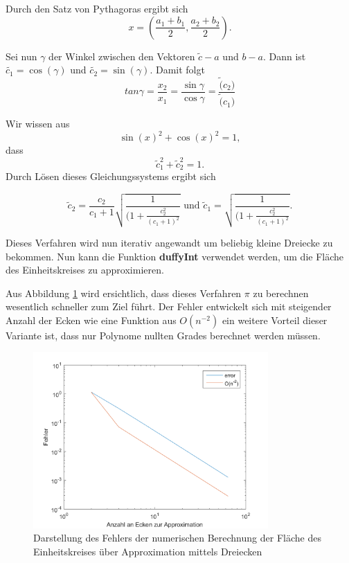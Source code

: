 \documentclass[a4paper,11pt,bibliography=totoc,listof=totoc,headinclude=true,cleardoublepage=empty,oneside]{scrbook}
\begin{document}
Durch den Satz von Pythagoras ergibt sich
\begin{equation*}
	x=(\frac{a_1+b_1}{2},\frac{a_2+b_2}{2}).
\end{equation*}  

\noindent Sei nun $\gamma$ der Winkel zwischen den Vektoren $\tilde{c}-a$ und $b-a$. Dann ist $\tilde{c_1} = \cos(\gamma)$ und $\tilde{c_2} = \sin(\gamma)$. Damit folgt
\begin{equation}
	tan \gamma = \frac{x_2}{x_1} = \frac{\sin\gamma}{\cos\gamma} = \frac{\tilde(c_2)}{\tilde(c_1)}
\end{equation}

Wir wissen aus
\begin{equation*}
	\sin(x)^2+\cos(x)^2=1, 
\end{equation*}
dass 
\begin{equation*}
	\tilde c_1^2+\tilde c_2^2=1.
\end{equation*}
Durch Lösen dieses Gleichungssystems ergibt sich 

\begin{equation*}
	\tilde c_2=\frac{c_2}{c_1+1}\sqrt{\frac{1}{(1+\frac{c_2^2}{(c_1+1)^2}}} \text{ und } \tilde c_1 = \sqrt{\frac{1}{(1+\frac{c_2^2}{(c_1+1)^2}}}.
\end{equation*}

\noindent Dieses Verfahren wird nun iterativ angewandt um beliebig kleine Dreiecke zu bekommen. Nun kann die Funktion \textbf{duffyInt} verwendet werden, um die Fläche des Einheitskreises zu approximieren. 

\begin{minipage}{\textwidth}	
	\color{change}
	\lstset{ 
		language=Matlab, 
		showstringspaces=false}
	 
\end{minipage}

Aus Abbildung \ref{fig:3_5_4} wird ersichtlich, dass dieses Verfahren $\pi$ zu berechnen wesentlich schneller zum Ziel führt. Der Fehler entwickelt sich mit steigender Anzahl der Ecken wie eine Funktion aus $O(n^{-2})$ ein weitere Vorteil dieser Variante ist, dass nur Polynome nullten Grades berechnet werden müssen. 

\begin{figure}[h]
	\centering
	\includegraphics[width=0.8\textwidth]{plot_3_5_4.png}
	\caption{Darstellung des Fehlers der numerischen Berechnung der Fläche des Einheitskreises über Approximation mittels Dreiecken}
	\label{fig:3_5_4}
\end{figure}



					
				
				
		
		
	
			
	
	
		
	
			
	
	
\end{document}

